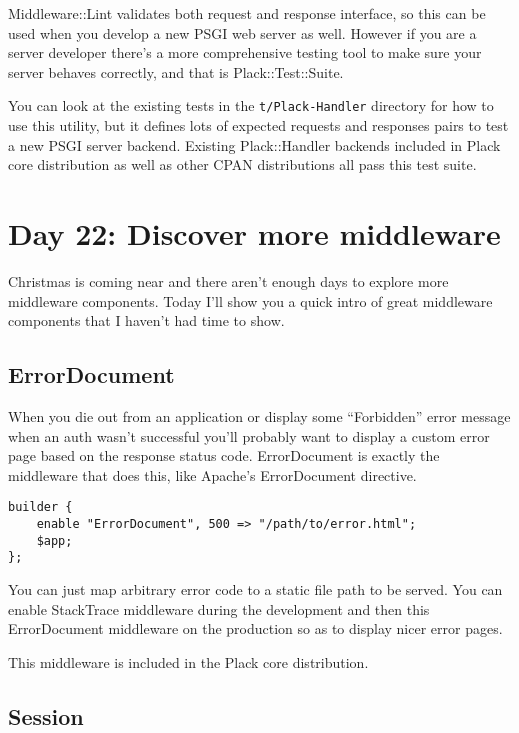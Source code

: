 Middleware::Lint validates both request and response interface, so this
can be used when you develop a new PSGI web server as well. However if
you are a server developer there's a more comprehensive testing tool to
make sure your server behaves correctly, and that is Plack::Test::Suite.

You can look at the existing tests in the \lstinline!t/Plack-Handler!
directory for how to use this utility, but it defines lots of expected
requests and responses pairs to test a new PSGI server backend. Existing
Plack::Handler backends included in Plack core distribution as well as
other CPAN distributions all pass this test suite.

\chapter{Day 22: Discover more
middleware}\label{day-22-discover-more-middleware}

Christmas is coming near and there aren't enough days to explore more
middleware components. Today I'll show you a quick intro of great
middleware components that I haven't had time to show.

\section{ErrorDocument}\label{errordocument}

When you die out from an application or display some ``Forbidden'' error
message when an auth wasn't successful you'll probably want to display a
custom error page based on the response status code. ErrorDocument is
exactly the middleware that does this, like Apache's ErrorDocument
directive.

\begin{lstlisting}
builder {
    enable "ErrorDocument", 500 => "/path/to/error.html";
    $app;
};
\end{lstlisting}

You can just map arbitrary error code to a static file path to be
served. You can enable StackTrace middleware during the development and
then this ErrorDocument middleware on the production so as to display
nicer error pages.

This middleware is included in the Plack core distribution.

\section{Session}\label{session}


